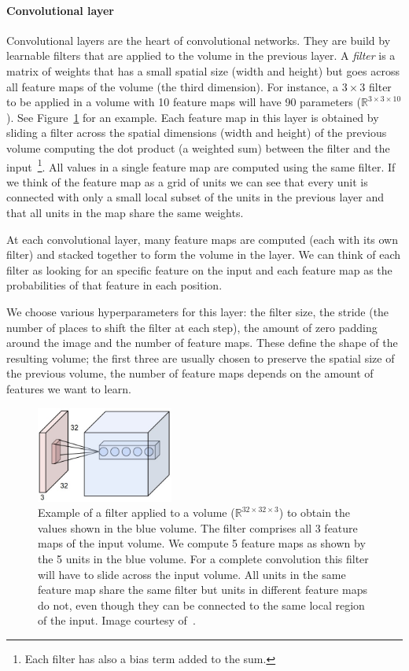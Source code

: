 \paragraph{Convolutional layer} Convolutional layers are the heart of convolutional networks. They are build by learnable filters that are applied to the volume in the previous layer. A \emph{filter} is a matrix of weights that has a small spatial size (width and height) but goes across all feature maps of the volume (the third dimension). For instance, a $3\times 3$ filter to be applied in a volume with 10 feature maps will have 90 parameters ($\mathbb{R}^{3\times3\times10}$). See Figure~\ref{fig:ConvLayer} for an example. Each feature map in this layer is obtained by sliding a filter across the spatial dimensions (width and height) of the previous volume computing the dot product (a weighted sum) between the filter and the input~\footnote{Each filter has also a bias term added to the sum.}. All values in a single feature map are computed using the same filter. If we think of the feature map as a grid of units we can see that every unit is connected with only a small local subset of the units in the previous layer and that all units in the map share the same weights. 

At each convolutional layer, many feature maps are computed (each with its own filter) and stacked together to form the volume in the layer. We can think of each filter as looking for an specific feature on the input and each feature map as the probabilities of that feature in each position.

We choose various hyperparameters for this layer: the filter size, the stride (the number of places to shift the filter at each step), the amount of zero padding around the image and the number of feature maps. These define the shape of the resulting volume; the first three are usually chosen to preserve the spatial size of the previous volume, the number of feature maps depends on the amount of features we want to learn.
\begin{figure}[h]
	\centering
	\includegraphics[width = 0.4\textwidth]{plots/convLayer.jpeg}
	\caption[Example of a filter in a convolutional layer]{Example of a filter applied to a volume ($\mathbb{R}^{32\times 32\times 3}$) to obtain the values shown in the blue volume. The filter comprises all 3 feature maps of the input volume. We compute 5 feature maps as shown by the 5 units in the blue volume. For a complete convolution this filter will have to slide across the input volume. All units in the same feature map share the same filter but units in different feature maps do not, even though they can be connected to the same local region of the input. Image courtesy of~\cite{Karpathy2015}.}
	\label{fig:ConvLayer}
\end{figure}

